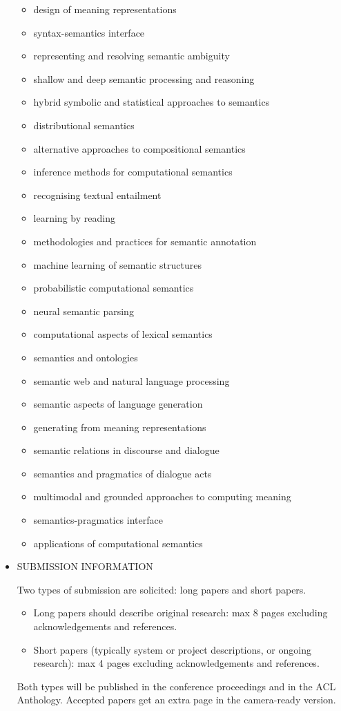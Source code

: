 \documentclass[prodmode,acmtecs]{acmsmall} %
\begin{document}
\begin{itemize}
\begin{itemize}\item  design of meaning representations
\item  syntax-semantics interface
\item  representing and resolving semantic ambiguity
\item  shallow and deep semantic processing and reasoning
\item  hybrid symbolic and statistical approaches to semantics
\item  distributional semantics
\item  alternative approaches to compositional semantics
\item  inference methods for computational semantics
\item  recognising textual entailment
\item  learning by reading
\item  methodologies and practices for semantic annotation
\item  machine learning of semantic structures
\item  probabilistic computational semantics
\item  neural semantic parsing
\item  computational aspects of lexical semantics
\item  semantics and ontologies
\item  semantic web and natural language processing
\item  semantic aspects of language generation
\item  generating from meaning representations
\item  semantic relations in discourse and dialogue
\item  semantics and pragmatics of dialogue acts
\item  multimodal and grounded approaches to computing meaning
\item  semantics-pragmatics interface
\item  applications of computational semantics
\end{itemize} 
\item  SUBMISSION INFORMATION 
 
  Two types of submission are solicited: long papers and short papers. 
 
\begin{itemize}\item  Long papers should describe original research: max 8 pages excluding acknowledgements and references. 
\item  Short papers (typically system or project descriptions, or ongoing research): max 4 pages excluding acknowledgements and references.
\end{itemize} 
  Both types will be published in the conference proceedings and in the ACL Anthology. Accepted papers get an extra page in the camera-ready version. 
 

\end{itemize}
\end{document}
